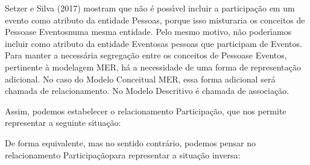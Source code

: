\documentclass[
12pt,		%
openright,	%
twoside,  %
a4paper,			%
chapter=TITLE,		%
english,			%
french,				%
spanish,			%
brazil				%
]{USPSC-classe/USPSC}
\begin{document}
Setzer e Silva (2017) mostram que n\~ao \'e poss\'{\i}vel incluir a participa\c{c}\~ao em um evento como atributo da entidade \textquotedbl Pessoas\textquotedbl , porque isso misturaria os conceitos de \textquotedbl Pessoas\textquotedbl  e \textquotedbl Eventos\textquotedbl  numa mesma entidade. Pelo mesmo motivo, n\~ao poder\'{\i}amos incluir como atributo da entidade \textquotedbl Eventos\textquotedbl  as  pessoas que participam de \textquotedbl Eventos\textquotedbl . Para manter a necess\'aria segrega\c{c}\~ao entre os conceitos de \textquotedbl Pessoas\textquotedbl  e \textquotedbl Eventos\textquotedbl , pertinente \`a modelagem MER, h\'a a necessidade de uma forma de representa\c{c}\~ao adicional. No caso do Modelo Conceitual MER, essa forma adicional ser\'a chamada de \textquotedbl relacionamento\textquotedbl . No Modelo Descritivo \'e chamada de \textquotedbl associa\c{c}\~ao\textquotedbl .














Assim, podemos estabelecer o relacionamento \textquotedbl Participa\c{c}\~ao\textquotedbl , que nos permite representar a seguinte situa\c{c}\~ao:















\noindent\begin{center}\mbox{\centering{}}\end{center}


De forma equivalente, mas no sentido contr\'ario, podemos pensar no  relacionamento \textquotedbl Participa\c{c}\~ao\textquotedbl  para representar a situa\c{c}\~ao inversa:















\noindent\begin{center}\mbox{\centering{}}\end{center}
\end{document}
